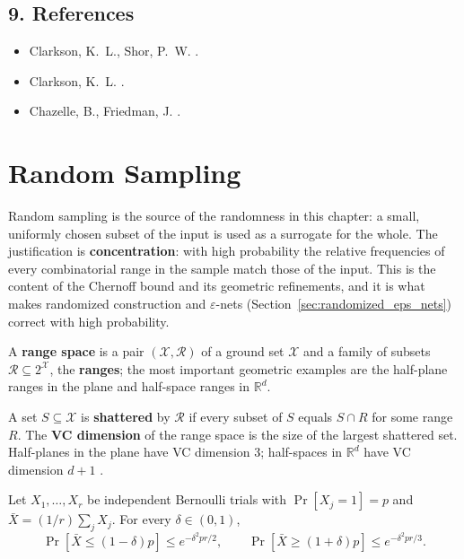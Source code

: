\subsection{9. References}

\begin{itemize}
\item Clarkson, K.~L., Shor, P.~W. \cite{clarkson1989}.
\item Clarkson, K.~L. \cite{clarkson1993}.
\item Chazelle, B., Friedman, J. \cite{chazellefriedman1990}.
\end{itemize}

\section{Random Sampling}
\label{sec:randomized_sampling}

Random sampling is the source of the randomness in this chapter: a small,
uniformly chosen subset of the input is used as a surrogate for the whole. The
justification is \textbf{concentration}: with high probability the relative
frequencies of every combinatorial range in the sample match those of the
input. This is the content of the Chernoff bound and its geometric refinements,
and it is what makes randomized construction and $\varepsilon$-nets
(Section~\ref{sec:randomized_eps_nets}) correct with high probability.

\begin{definition}\label{def:rand_range_space}
  A \textbf{range space} is a pair $(\mathcal{X}, \mathcal{R})$ of a ground set
  $\mathcal{X}$ and a family of subsets $\mathcal{R} \subseteq
  2^{\mathcal{X}}$, the \textbf{ranges}; the most important geometric examples
  are the half-plane ranges in the plane and half-space ranges in
  $\mathbb{R}^d$.
\end{definition}

\begin{definition}[VC Dimension]\label{def:rand_vc_dimension}
  A set $S \subseteq \mathcal{X}$ is \textbf{shattered} by $\mathcal{R}$ if
  every subset of $S$ equals $S \cap R$ for some range $R$. The \textbf{VC
  dimension} of the range space is the size of the largest shattered set.
  Half-planes in the plane have VC dimension 3; half-spaces in $\mathbb{R}^d$
  have VC dimension $d + 1$ \cite{hausslerwelzl1987}.
\end{definition}

\begin{theorem}\label{thm:rand_chernoff}
  Let $X_1, \dots, X_r$ be independent Bernoulli trials with $\Pr[X_j = 1] = p$
  and $\bar{X} = (1/r) \sum_j X_j$. For every $\delta \in (0,1)$,
  \[
    \Pr[\bar{X} \le (1-\delta)p] \le e^{-\delta^2 p r / 2},
    \qquad
    \Pr[\bar{X} \ge (1+\delta)p] \le e^{-\delta^2 p r / 3}.
  \]
\end{theorem}


